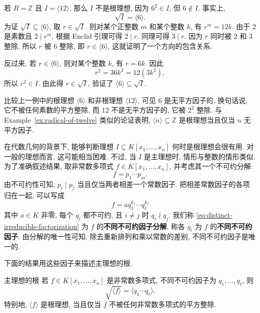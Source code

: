 \begin{Example}{}\leavevmode\label{ex:radical-of-twelve}
  若 $R=\mathbb{Z}$ 且 $I=\langle12\rangle$, 那么 $I$ 不是根理想, 因为 $6^{2}\in I$, 但 $6\notin I$. 事实上,
  \[
    \sqrt{I}=\langle6\rangle.
  \]
  为证 $\sqrt{I}\subseteq\langle6\rangle$, 取 $r\in\sqrt{I}$. 则对某个正整数 $m$ 和某个整数 $k$, 有 $r^{m}=12k$. 由于 $2$ 是素数且 $2\mid r^{m}$, 根据 Euclid 引理可得 $2\mid r$. 同理可得 $3\mid r$. 因为 $r$ 同时被 $2$ 和 $3$ 整除, 所以 $r$ 被 $6$ 整除, 即 $r\in\langle6\rangle$, 这就证明了一个方向的包含关系.

  反过来, 若 $r\in\langle6\rangle$, 则对某个整数 $k$, 有 $r=6k$. 因此
  \[
    r^{2}=36k^{2}=12(3k^{2}),
  \]
  所以 $r^{2}\in I$. 由此得 $r\in\sqrt{I}$, 验证了 $\langle6\rangle\subseteq\sqrt{I}$.
\end{Example}

比较上一例中的根理想 $\langle6\rangle$ 和非根理想 $\langle12\rangle$, 可见 $6$ 是无平方因子的, 换句话说, 它不被任何素数的平方整除. 而 $12$ 不是无平方因子的, 它被 $2^{2}$ 整除. 与 Example~\ref{ex:radical-of-twelve} 类似的论证表明, $\langle n\rangle\subseteq\mathbb{Z}$ 是根理想当且仅当 $n$ 无平方因子.

在代数几何的背景下, 能够判断理想 $I\subseteq K[x_{1},\ldots,x_{n}]$ 何时是根理想会很有用. 对一般的理想而言, 这可能相当困难. 不过, 当 $I$ 是主理想时, 情形与整数的情形类似. 为了准确叙述结果, 取非常数多项式 $f\in K[x_{1},\ldots,x_{n}]$, 并考虑其一个不可约分解:
\[
  f=p_{1}\cdots p_{m}.
\]
由不可约性可知, $p_{i}\mid p_{j}$ 当且仅当两者相差一个常数因子. 把相差常数因子的各项归在一起, 可以写成
\begin{equation}\label{eq:distinct-irreducible-factorization}
  f=aq_{1}^{k_{1}}\cdots q_{\ell}^{k_{\ell}}
\end{equation}
其中 $a\in K$ 非零, 每个 $q_{i}$ 都不可约, 且 $i\ne j$ 时 $q_{i}\nmid q_{j}$. 我们称 \eqref{eq:distinct-irreducible-factorization} 为 $f$ 的\textbf{不同不可约因子分解}, 称各 $q_{i}$ 为 $f$ 的\textbf{不同不可约因子}. 由分解的唯一性可知, 除去重新排列和乘以常数的差别, 不同不可约因子是唯一的.

下面的结果用这些因子来描述主理想的根.

\begin{Proposition}{主理想的根}\leavevmode\label{prop:radicals-of-principal-ideals}
  若 $f\in K[x_{1},\ldots,x_{n}]$ 是非常数多项式, 不同不可约因子为 $q_{1},\ldots,q_{\ell}$, 则
  \[
    \sqrt{\langle f\rangle}=\langle q_{1}\cdots q_{\ell}\rangle.
  \]
  特别地, $\langle f\rangle$ 是根理想, 当且仅当 $f$ 不被任何非常数多项式的平方整除.
\end{Proposition}

